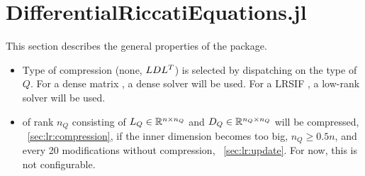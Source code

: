 \section{DifferentialRiccatiEquations.jl}

This section describes the general properties of the  package.

\begin{itemize}
  \item
    Type of compression (none, $LDL^T$) is selected by dispatching on the type of $Q$.
    For a dense matrix , a dense solver will be used.
    For a \ac{LRSIF} , a low-rank solver will be used.
  \item
     of rank $n_Q$ consisting of $L_Q \in\mathbb{R}^{n\times n_Q}$ and $D_Q\in\mathbb{R}^{n_Q\times n_Q}$ will be compressed,
    \cf~\autoref{sec:lr:compression},
    if the inner dimension becomes too big, $n_Q \geq 0.5 n$,
    and every 20 modifications without compression,
    \cf~\autoref{sec:lr:update}.
    For now, this is not configurable.
\end{itemize}
